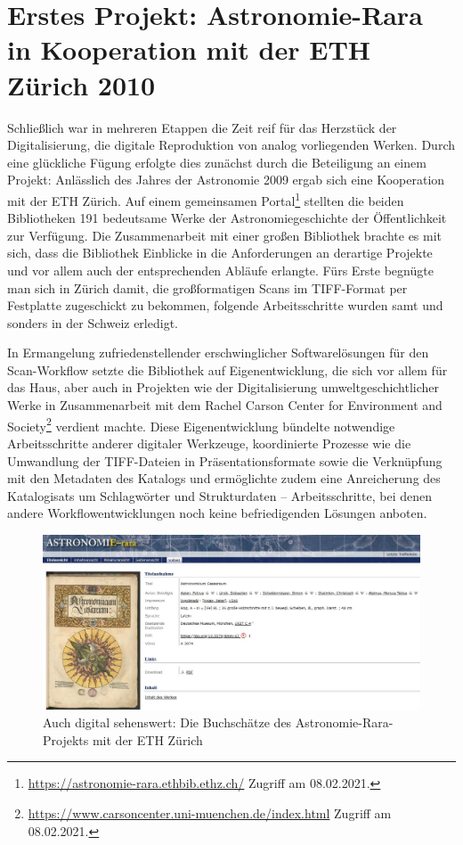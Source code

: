 \documentclass[a4paper,
fontsize=11pt,
oneside,
numbers=noperiodatend,
parskip=half-,
bibliography=totoc,
final
]{scrartcl}
\begin{document}
\hypertarget{erstes-projekt-astronomie-rara-in-kooperation-mit-der-eth-zuxfcrich-2010}{%
\section{Erstes Projekt: Astronomie-Rara in Kooperation mit der
ETH Zürich
2010}\label{erstes-projekt-astronomie-rara-in-kooperation-mit-der-eth-zuxfcrich-2010}}

Schließlich war in mehreren Etappen die Zeit reif für das Herzstück der
Digitalisierung, die digitale Reproduktion von analog vorliegenden
Werken. Durch eine glückliche Fügung erfolgte dies zunächst durch die
Beteiligung an einem Projekt: Anlässlich des Jahres der Astronomie 2009
ergab sich eine Kooperation mit der ETH Zürich. Auf einem gemeinsamen
Portal\footnote{\url{https://astronomie-rara.ethbib.ethz.ch/} Zugriff am
  08.02.2021.} stellten die beiden Bibliotheken 191 bedeutsame Werke der
Astronomiegeschichte der Öffentlichkeit zur Verfügung. Die
Zusammenarbeit mit einer großen Bibliothek brachte es mit sich, dass die
Bibliothek Einblicke in die Anforderungen an derartige Projekte und vor
allem auch der entsprechenden Abläufe erlangte. Fürs Erste begnügte man
sich in Zürich damit, die großformatigen Scans im TIFF-Format per
Festplatte zugeschickt zu bekommen, folgende Arbeitsschritte wurden samt
und sonders in der Schweiz erledigt.

In Ermangelung zufriedenstellender erschwinglicher Softwarelösungen für
den Scan-Workflow setzte die Bibliothek auf Eigenentwicklung, die sich
vor allem für das Haus, aber auch in Projekten wie der Digitalisierung
umweltgeschichtlicher Werke in Zusammenarbeit mit dem Rachel Carson
Center for Environment and Society\footnote{\url{https://www.carsoncenter.uni-muenchen.de/index.html}
  Zugriff am 08.02.2021.} verdient machte. Diese Eigenentwicklung
bündelte notwendige Arbeitsschritte anderer digitaler Werkzeuge,
koordinierte Prozesse wie die Umwandlung der TIFF-Dateien in
Präsentationsformate sowie die Verknüpfung mit den Metadaten des
Katalogs und ermöglichte zudem eine Anreicherung des Katalogisats um
Schlagwörter und Strukturdaten -- Arbeitsschritte, bei denen andere
Workflowentwicklungen noch keine befriedigenden Lösungen anboten.

\begin{figure}
\centering
\includegraphics[width=.95\textwidth]{img/Abb4.jpg}
\caption{Auch digital sehenswert: Die Buchschätze des
Astronomie-Rara-Projekts mit der ETH Zürich}
\end{figure}
\end{document}
